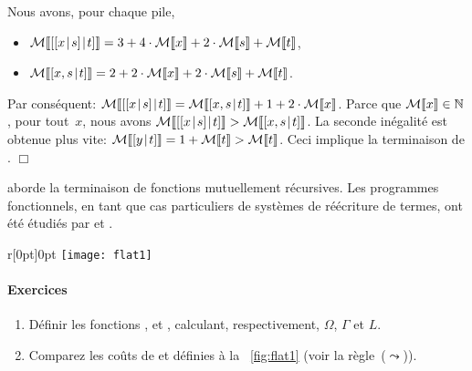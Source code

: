 Nous avons, pour chaque pile,
\begin{itemize}

  \item \(\mathcal{M}\llbracket{[{[{x}\!\mid\!{s}]}\!\mid\!{t}]}\rrbracket = 3 + 4\cdot\mathcal{M}\llbracket{x}\rrbracket +
    2\cdot\mathcal{M}\llbracket{s}\rrbracket + \mathcal{M}\llbracket{t}\rrbracket\),

  \item \(\mathcal{M}\llbracket{[{x,s}\!\mid\!{t}]}\rrbracket = 2 + 2\cdot\mathcal{M}\llbracket{x}\rrbracket +
    2\cdot\mathcal{M}\llbracket{s}\rrbracket + \mathcal{M}\llbracket{t}\rrbracket\).

\end{itemize}
Par conséquent: \(\mathcal{M}\llbracket{[{[{x}\!\mid\!{s}]}\!\mid\!{t}]}\rrbracket =
\mathcal{M}\llbracket{[{x,s}\!\mid\!{t}]}\rrbracket + 1 + 2\cdot\mathcal{M}\llbracket{x}\rrbracket\). Parce que
\(\mathcal{M}\llbracket{x}\rrbracket \in \mathbb{N}\), pour tout~\(x\), nous avons
\(\mathcal{M}\llbracket{[{[{x}\!\mid\!{s}]}\!\mid\!{t}]}\rrbracket > \mathcal{M}\llbracket{[{x,s}\!\mid\!{t}]}\rrbracket\). La
seconde inégalité est obtenue plus vite: \(\mathcal{M}\llbracket{[{y}\!\mid\!{t}]}\rrbracket = 1 +
\mathcal{M}\llbracket{t}\rrbracket > \mathcal{M}\llbracket{t}\rrbracket\). Ceci implique la terminaison de
.
\hfill\(\Box\)

\cite{Giesl_1997} aborde la terminaison de fonctions mutuellement
récursives. Les programmes fonctionnels, en tant que cas particuliers
de systèmes de réécriture de termes, ont été étudiés par
\cite{Giesl_1995b} et \cite{GieslWaltherBrauburger_1998}.

%
\begin{wrapfigure}[7]{r}[0pt]{0pt}
\centering
\texttt{[image: flat1]}
\caption{Aplatissement alternatif}
\label{fig:flat1}
\end{wrapfigure}
\paragraph{Exercices}

\begin{enumerate}

  \item Définir les fonctions ,  et
    , calculant, respectivement, \(\Omega\), \(\Gamma\)
    et \(L\).

  \item Comparez les coûts de  et
      définies à la
    \fig~\ref{fig:flat1} (voir la règle~(\(\leadsto\))).

\end{enumerate}
